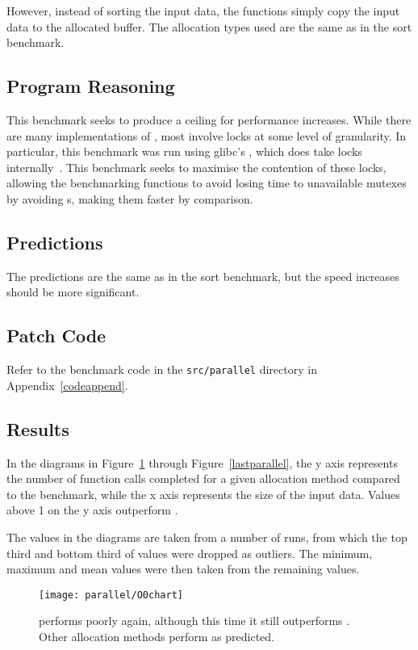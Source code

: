 However, instead of sorting the input data, the functions simply copy the input data to the allocated buffer. The allocation types used are the same as in the sort benchmark.

\subsection{Program Reasoning}

This benchmark seeks to produce a ceiling for performance increases. While there are many implementations of \malloc{}, most involve locks at some level of granularity. In particular, this benchmark was run using glibc's \malloc{}, which does take locks internally~\cite{glibcmalloc}. This benchmark seeks to maximise the contention of these locks, allowing the benchmarking functions to avoid losing time to unavailable mutexes by avoiding \malloc{}s, making them faster by comparison.

\subsection{Predictions}

The predictions are the same as in the sort benchmark, but the speed increases should be more significant.

\subsection{Patch Code}

Refer to the benchmark code in the \texttt{src/parallel} directory in Appendix~\ref{codeappend}.

\subsection{Results}

In the diagrams in Figure~\ref{firstparallel} through Figure~\ref{lastparallel}, the y axis represents the number of function calls completed for a given allocation method compared to the  benchmark, while the x axis represents the size of the input data. Values above 1 on the y axis outperform \malloc{}.

The values in the diagrams are taken from a number of runs, from which the top third and bottom third of values were dropped as outliers. The minimum, maximum and mean values were then taken from the remaining values.

\begin{figure}[h]
	\centering
	\texttt{[image: parallel/O0chart]}
	\caption{ performs poorly again, although this time it still outperforms . Other allocation methods perform as predicted.}\label{firstparallel}
\end{figure}

